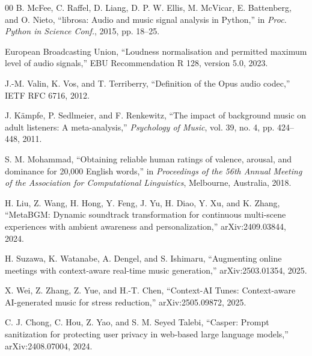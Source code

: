 \documentclass[conference]{IEEEtran}
\begin{document}
\begin{thebibliography}{00}
 B. McFee, C. Raffel, D. Liang, D. P. W. Ellis, M. McVicar, E. Battenberg, and O. Nieto, ``librosa: Audio and music signal analysis in Python,'' in \emph{Proc. Python in Science Conf.}, 2015, pp. 18--25.

 European Broadcasting Union, ``Loudness normalisation and permitted maximum level of audio signals,'' EBU Recommendation R 128, version 5.0, 2023.

 J.-M. Valin, K. Vos, and T. Terriberry, ``Definition of the Opus audio codec,'' IETF RFC 6716, 2012.

 J. K\"ampfe, P. Sedlmeier, and F. Renkewitz, ``The impact of background music on adult listeners: A meta-analysis,'' \emph{Psychology of Music}, vol. 39, no. 4, pp. 424--448, 2011.

 S. M. Mohammad, ``Obtaining reliable human ratings of valence, arousal, and dominance for 20,000 English words,'' in \emph{Proceedings of the 56th Annual Meeting of the Association for Computational Linguistics}, Melbourne, Australia, 2018.

 H. Liu, Z. Wang, H. Hong, Y. Feng, J. Yu, H. Diao, Y. Xu, and K. Zhang, ``MetaBGM: Dynamic soundtrack transformation for continuous multi-scene experiences with ambient awareness and personalization,'' arXiv:2409.03844, 2024.

 H. Suzawa, K. Watanabe, A. Dengel, and S. Ishimaru, ``Augmenting online meetings with context-aware real-time music generation,'' arXiv:2503.01354, 2025.

 X. Wei, Z. Zhang, Z. Yue, and H.-T. Chen, ``Context-AI Tunes: Context-aware AI-generated music for stress reduction,'' arXiv:2505.09872, 2025.

 C. J. Chong, C. Hou, Z. Yao, and S. M. Seyed Talebi, ``Casper: Prompt sanitization for protecting user privacy in web-based large language models,'' arXiv:2408.07004, 2024.

\end{thebibliography}
\end{document}
